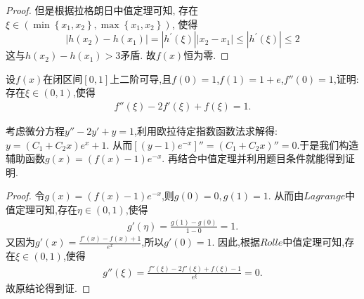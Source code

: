 \documentclass[lang=cn,newtx,10pt,scheme=chinese]{../Template/elegantbook}
\begin{document}
\begin{proof}
但是根据拉格朗日中值定理可知,
存在$\xi \in \left( \min \left\{ x_1,x_2 \right\} ,\max \left\{ x_1,x_2 \right\} \right)$,
使得
\begin{equation}
\left| h\left( x_2 \right) -h\left( x_1 \right) \right|=\left| h^{\prime}\left( \xi \right) \right|\left| x_2-x_1 \right|\le \left| h^{\prime}\left( \xi \right) \right|\le 2
\nonumber
\end{equation}
这与$h(x_2)-h(x_1)>3$矛盾.
故$f(x)$恒为零.
\end{proof}

\begin{example}
设\(f(x)\)在闭区间\([0,1]\)上二阶可导,且\(f(0)=1\),\(f(1)=1 + e\),\(f''(0)=1\),证明:存在\(\xi\in(0,1)\),使得
\begin{align*}
f''(\xi)-2f'(\xi)+f(\xi)=1.
\nonumber
\end{align*}
\end{example}
\begin{note}
考虑微分方程$y''-2y'+y=1$,利用欧拉待定指数函数法求解得:$y=(C_1+C_2x)e^x+1$.
从而$[(y-1)e^{-x}]''=(C_1+C_2x)''=0$.于是我们构造辅助函数$g(x)=(f(x)-1)e^{-x}$.
再结合中值定理并利用题目条件就能得到证明.
\end{note}
\begin{proof}
令$g(x)=(f(x)-1)e^{-x}$,则$g(0)=0,g(1)=1$.
从而由$Lagrange$中值定理可知,存在$\eta\in(0,1)$,使得
\begin{align*}
g'(\eta)=\frac{g(1)-g(0)}{1-0}=1.
\nonumber
\end{align*}
又因为$g'(x)=\frac{f'\left( x \right) -f\left( x \right) +1}{e^x}$,所以$g'(0)=1$.
因此,根据$Rolle$中值定理可知,存在$\xi\in(0,1)$,使得
\begin{align*}
g''\left( \xi \right) =\frac{f''\left( \xi \right) -2f'\left( \xi \right) +f\left( \xi \right)-1}{e^{\xi}}=0.
\nonumber
\end{align*}
故原结论得到证.
\end{proof}
\end{document}
